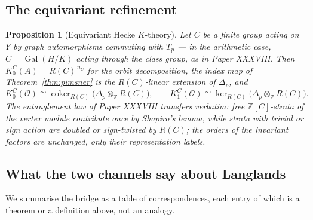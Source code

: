 \documentclass[11pt]{amsart}
\numberwithin{equation}{section}
\newtheorem{proposition}[theorem]{Proposition}
\theoremstyle{definition}
\theoremstyle{remark}
\newcommand{\Z}{\mathbb{Z}}
\newcommand{\cO}{\mathcal{O}}
\newcommand{\Gal}{\operatorname{Gal}}
\newcommand{\coker}{\operatorname{coker}}
\begin{document}
\subsection{The equivariant refinement}

\begin{proposition}[Equivariant Hecke $K$-theory]\label{prop:equivariant}
Let $C$ be a finite group acting on $Y$ by graph automorphisms commuting with $T_p$ ---
in the arithmetic case, $C=\Gal(H/K)$ acting through the class group, as in Paper
XXXVIII. Then $K_0^C(A)=R(C)^{\,n_C}$ for the orbit decomposition, the index map of
Theorem~\ref{thm:pimsner} is the $R(C)$-linear extension of $\Delta_p$, and
\[
K_0^C(\cO)\cong\coker_{R(C)}\bigl(\Delta_p\otimes_\Z R(C)\bigr),
\qquad
K_1^C(\cO)\cong\ker_{R(C)}\bigl(\Delta_p\otimes_\Z R(C)\bigr).
\]
The entanglement law of Paper XXXVIII transfers verbatim: free $\Z[C]$-strata of the
vertex module contribute once by Shapiro's lemma, while strata with trivial or sign
action are doubled or sign-twisted by $R(C)$; the orders of the invariant factors are
unchanged, only their representation labels.
\end{proposition}

\subsection{What the two channels say about Langlands}

We summarise the bridge as a table of correspondences, each entry of which is a theorem
or a definition above, not an analogy.
\end{document}
